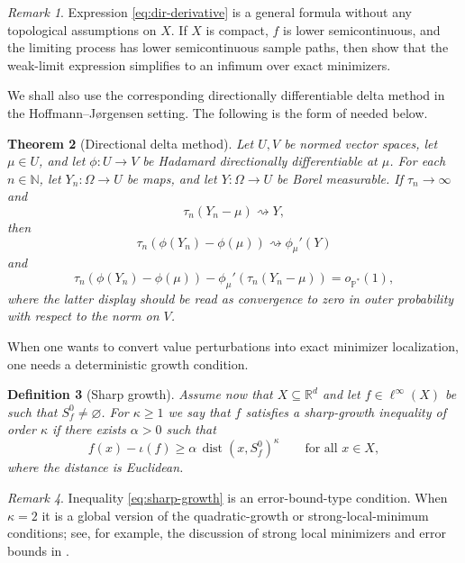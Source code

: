\documentclass[11pt]{article}
\newtheorem{theorem}{Theorem}[section]
\newtheorem{definition}[theorem]{Definition}\newtheorem{example}[theorem]{Example}\theoremstyle{remark}
\newtheorem{remark}[theorem]{Remark}
\begin{document}
\begin{remark} Expression \eqref{eq:dir-derivative} is a
general formula without any topological assumptions on $X$. If $X$
is compact, $f$ is lower semicontinuous, and the limiting process
has lower semicontinuous sample paths, then \citet[Remark~4.3]{Westerhout2024}
show that the weak-limit expression simplifies to an infimum over
exact minimizers. \end{remark}

We shall also use the corresponding directionally differentiable delta
method in the Hoffmann--Jørgensen setting. The following is the form
of \citet[Fact~3.2]{Westerhout2024} needed below.

\begin{theorem}[Directional delta method]\label{thm:directional-delta}
Let $U,V$ be normed vector spaces, let $\mu\in U$, and let
$\phi:U\to V$ be Hadamard directionally differentiable at $\mu$.
For each $n\in\mathbb{N}$, let $Y_{n}:\Omega\to U$ be maps, and
let $Y:\Omega\to U$ be Borel measurable. If $\tau_{n}\to\infty$ and
\[
\tau_{n}(Y_{n}-\mu)\rightsquigarrow Y,
\]
then
\[
\tau_{n}(\phi(Y_{n})-\phi(\mu))\rightsquigarrow\phi_{\mu}'(Y)
\]
and
\[
\tau_{n}(\phi(Y_{n})-\phi(\mu))-\phi_{\mu}'(\tau_{n}(Y_{n}-\mu))=o_{\mathbb{P}^{*}}(1),
\]
where the latter display should be read as convergence to zero in outer probability
with respect to the norm on $V$.
\end{theorem}

When one wants to convert value perturbations into exact minimizer
localization, one needs a deterministic growth condition.

\begin{definition}[Sharp growth]\label{def:sharp} Assume now that
$X\subseteq\mathbb{R}^{d}$ and let $f\in\ell^{\infty}(X)$ be such
that $S_{f}^{0}\neq\varnothing$. For $\kappa\ge1$ we say that $f$
satisfies a sharp-growth inequality of order $\kappa$ if there exists
$\alpha>0$ such that 
\begin{equation}
f(x)-\iota(f)\ge\alpha\,\operatorname{dist}(x,S_{f}^{0})^{\kappa}\qquad\text{for all }x\in X,\label{eq:sharp-growth}
\end{equation}
where the distance is Euclidean. \end{definition}

\begin{remark} Inequality \eqref{eq:sharp-growth} is an error-bound-type
condition. When $\kappa=2$ it is a global version of the quadratic-growth
or strong-local-minimum conditions; see, for example, the discussion
of strong local minimizers and error bounds in \citet[Section~8.1]{CuiPang2022}.
\end{remark}
\end{document}
